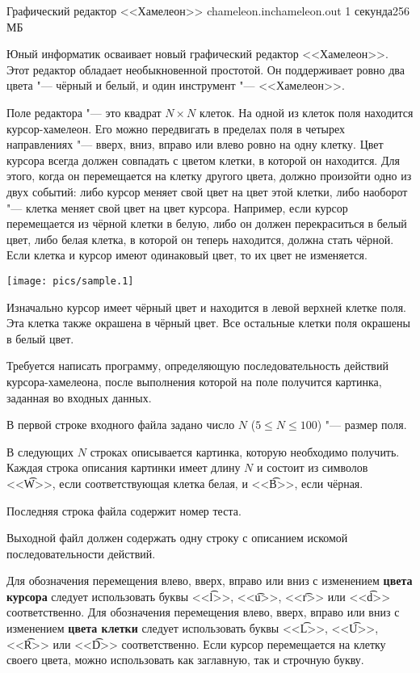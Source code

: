 \begin{problem}{Графический редактор <<Хамелеон>>}
{chameleon.in}{chameleon.out}
{1 секунда}{256 МБ}

Юный информатик осваивает новый графический редактор <<Хамелеон>>.
Этот редактор обладает необыкновенной простотой.
Он поддерживает ровно два цвета "--- чёрный и белый, и один
инструмент "--- <<Хамелеон>>.

Поле редактора "--- это квадрат $N \times N$ клеток.
На одной из клеток поля находится курсор-хамелеон.
Его можно передвигать в пределах поля в четырех направлениях "--- вверх,
вниз, вправо или влево ровно на одну клетку.
Цвет курсора всегда должен совпадать с цветом клетки, в которой он находится.
Для этого, когда он перемещается на клетку другого цвета, должно произойти
одно из двух событий: либо курсор меняет свой цвет на цвет этой клетки,
либо наоборот "--- клетка меняет свой цвет на цвет курсора. Например, если курсор
перемещается из чёрной клетки в белую, либо он должен перекраситься в белый цвет,
либо белая клетка, в которой он теперь находится, должна стать чёрной.
Если клетка и курсор имеют одинаковый цвет, то их цвет не изменяется.

\begin{center}
  \texttt{[image: pics/sample.1]}
\end{center}

Изначально курсор имеет чёрный цвет и находится в левой верхней клетке поля.
Эта клетка также окрашена в чёрный цвет. Все остальные клетки поля окрашены
в белый цвет.

Требуется написать программу, определяющую последовательность 
действий курсора-хамелеона, после выполнения которой на поле получится
картинка, заданная во входных данных.

\InputFile

В первой строке входного файла задано число $N$ ($5 \leqslant N \leqslant 100$) "---
размер поля.

В следующих $N$ строках описывается картинка, которую необходимо получить. 
Каждая строка описания картинки имеет длину $N$ и состоит
из символов <<\t{W}>>, если соответствующая
клетка белая, и <<\t{B}>>, если чёрная.

Последняя строка файла содержит номер теста.

\OutputFile

Выходной файл должен содержать одну строку с описанием искомой
последовательности действий.

Для обозначения перемещения влево, вверх, вправо или вниз
с изменением {\bf цвета курсора} следует использовать буквы <<\t{l}>>, <<\t{u}>>, <<\t{r}>> или <<\t{d}>> соответственно.
Для обозначения перемещения влево, вверх, вправо или вниз
с изменением {\bf цвета клетки} следует использовать буквы <<\t{L}>>, <<\t{U}>>, <<\t{R}>> или <<\t{D}>> соответственно.
Если курсор перемещается на клетку своего цвета, можно использовать как
заглавную, так и строчную букву.


\end{problem}
